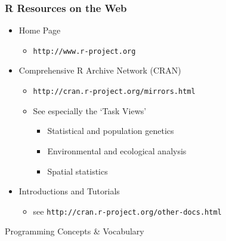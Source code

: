 \documentclass{beamer}
\begin{document}
\begin{frame}
  \frametitle{R Resources on the Web}
\begin{itemize}

\item Home Page
\begin{itemize}
	\item \texttt{http://www.r-project.org}
\end{itemize}

\item Comprehensive R Archive Network (CRAN)
\begin{itemize}
	\item \texttt{http://cran.r-project.org/mirrors.html}
	\item See especially the `Task Views'
			\begin{itemize}
				\item Statistical and population genetics
				\item Environmental and ecological analysis
				\item Spatial statistics
			\end{itemize}
\end{itemize}

\item Introductions and Tutorials
\begin{itemize}
	\item see \texttt{http://cran.r-project.org/other-docs.html}
\end{itemize}

\end{itemize}
\end{frame}

\begin{frame}

\begin{center}
\LARGE{Programming Concepts \& Vocabulary}

\end{center}
\end{frame}
\end{document}

